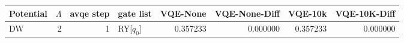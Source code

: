 \begin{tabular}{lrrlrrrr}
\toprule
Potential & $\Lambda$ & avqe step & gate list & VQE-None & VQE-None-Diff & VQE-10k & VQE-10K-Diff \\
\midrule
DW & 2 & 1 & RY[$q_0$] & 0.357233 & 0.000000 & 0.357233 & 0.000000 \\
\bottomrule
\end{tabular}
